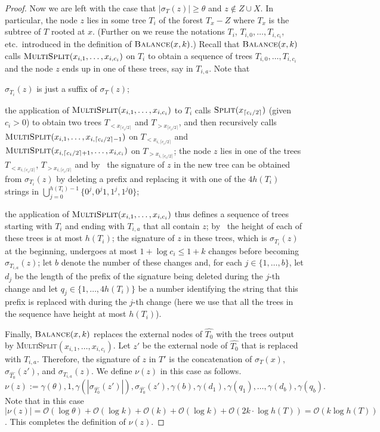\documentclass[kpfonts]{patmorin}
\newcommand{\Oh}{\mathcal{O}}
\let\leq\leqslant
\let\geq\geqslant
\begin{document}
\begin{proof}
  Now we are left with the case that $|\sigma_{T}(z)|\geq \theta$ and $z\not\in Z\cup X$. In particular, the node $z$ lies in some tree $T_i$ of the forest $T_x - Z$ where $T_x$ is the subtree of $T$ rooted at $x$.
  (Further on we reuse the notations $T_i$, $T_{i,0},\ldots,T_{i,c_i}$, etc.\ introduced in the definition of $\textsc{Balance}(x,k)$.)
  Recall that $\textsc{Balance}(x,k)$ calls $\textsc{MultiSplit}(x_{i,1},\ldots,x_{i,c_i})$ on $T_i$ to obtain a sequence of trees $T_{i,0},\ldots,T_{i,c_i}$ and the node $z$ ends up in one of these trees, say in $T_{i,a}$.
  Note that
  \begin{compactenum}[(i)]
  \item $\sigma_{T_i}(z)$ is just a suffix of $\sigma_{T}(z)$;
  \item the application of $\textsc{MultiSplit}(x_{i,1},\ldots,x_{i,c_i})$ to $T_i$ calls $\textsc{Split}(x_{
  \lceil c_i/2\rceil})$ (given $c_i>0$) to obtain two trees $T_{<x_{\lceil c_i/2\rceil}}$ and $T_{>x_{\lceil c_i/2\rceil}}$, and then recursively calls $\textsc{MultiSplit}(x_{i,1},\ldots,x_{i,\lceil c_i/2\rceil-1})$  on $T_{<x_{i,\lceil c_i/2\rceil}}$ and $\textsc{MultiSplit}(x_{i,\lceil c_i/2\rceil+1},\ldots,x_{i,c_i})$  on $T_{>x_{i,\lceil c_i/2\rceil}}$;
  the node $z$ lies in one of the trees $T_{<x_{i,\lceil c_i/2\rceil}}$, $T_{>x_{i,\lceil c_i/2\rceil}}$ and by~ the signature of $z$ in the new tree can be obtained from $\sigma_{T_i}(z)$ by deleting a prefix and replacing it with one of the $4h(T_i)$ strings in $\bigcup_{j=0}^{h(T_i)-1}\{0^j,0^j1,1^j,1^j0\}$;
  \item the application of $\textsc{MultiSplit}(x_{i,1},\ldots,x_{i,c_i})$ thus defines a sequence of trees starting with $T_i$ and ending with $T_{i,a}$ that all contain $z$;
  by~ the height of each of these trees is at most $h(T_i)$;
  the signature of $z$ in these trees, which is $\sigma_{T_i}(z)$ at the beginning, undergoes at most $1+\log c_i \leq 1+k$ changes
  before becoming $\sigma_{T_{i,a}}(z)$; let $b$ denote the number of these changes and, for each $j\in\{1,\ldots,b\}$, let $d_j$ be the length of the prefix of the signature being deleted during the $j$-th change and let $q_j\in \{1, \dots, 4h(T_i)\}$ be a number identifying the string that this prefix is replaced with during the $j$-th change (here we use that all the trees in the sequence have height at most $h(T_i)$).
  \end{compactenum}

  Finally, $\textsc{Balance}(x,k)$ replaces the external nodes of $\hat{T_0}$ with the trees output by \textsc{MultiSplit}$(x_{i,1},\ldots,x_{i,c_i})$.
  Let $z'$ be the external node of $\hat{T_0}$ that is replaced with $T_{i,a}$.
  Therefore, the signature of $z$ in $T'$ is the concatenation of $\sigma_{T}(x)$, $\sigma_{\hat{T_0}}(z')$, and $\sigma_{T_{i,a}}(z)$.
  We define $\nu(z)$ in this case as follows.
    \[
  \nu(z) := \gamma(\theta),1,\gamma(|\sigma_{\hat{T_0}}(z')|),\sigma_{\hat{T_0}}(z'),\gamma(b),
  \gamma(d_1),\gamma(q_1),\ldots,\gamma(d_b),\gamma(q_b).
  \]
  Note that in this case $|\nu(z)|=\Oh(\log\theta) + \Oh(\log k) + \Oh(k) + \Oh(\log k) + \Oh(2k\cdot\log h(T))=\Oh(k\log h(T))$.
  This completes the definition of $\nu(z)$.


\end{proof}
\end{document}
